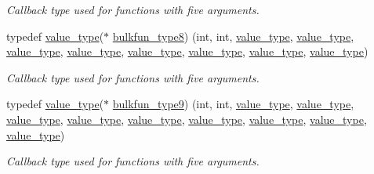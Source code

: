 \begin{DoxyCompactItemize}
\begin{DoxyCompactList}\small\item\em Callback type used for functions with five arguments. \end{DoxyCompactList}\item 
typedef \hyperlink{namespacemu_a17d4f113a4b88b8d971cca8ddbbe8a47}{value\+\_\+type}($\ast$ \hyperlink{namespacemu_aa4e562060c2c2377266ec1cf274856fe}{bulkfun\+\_\+type8}) (int, int, \hyperlink{namespacemu_a17d4f113a4b88b8d971cca8ddbbe8a47}{value\+\_\+type}, \hyperlink{namespacemu_a17d4f113a4b88b8d971cca8ddbbe8a47}{value\+\_\+type}, \hyperlink{namespacemu_a17d4f113a4b88b8d971cca8ddbbe8a47}{value\+\_\+type}, \hyperlink{namespacemu_a17d4f113a4b88b8d971cca8ddbbe8a47}{value\+\_\+type}, \hyperlink{namespacemu_a17d4f113a4b88b8d971cca8ddbbe8a47}{value\+\_\+type}, \hyperlink{namespacemu_a17d4f113a4b88b8d971cca8ddbbe8a47}{value\+\_\+type}, \hyperlink{namespacemu_a17d4f113a4b88b8d971cca8ddbbe8a47}{value\+\_\+type}, \hyperlink{namespacemu_a17d4f113a4b88b8d971cca8ddbbe8a47}{value\+\_\+type})
\begin{DoxyCompactList}\small\item\em Callback type used for functions with five arguments. \end{DoxyCompactList}\item 
typedef \hyperlink{namespacemu_a17d4f113a4b88b8d971cca8ddbbe8a47}{value\+\_\+type}($\ast$ \hyperlink{namespacemu_a51c71d5698d29b40688feaa8e968efc9}{bulkfun\+\_\+type9}) (int, int, \hyperlink{namespacemu_a17d4f113a4b88b8d971cca8ddbbe8a47}{value\+\_\+type}, \hyperlink{namespacemu_a17d4f113a4b88b8d971cca8ddbbe8a47}{value\+\_\+type}, \hyperlink{namespacemu_a17d4f113a4b88b8d971cca8ddbbe8a47}{value\+\_\+type}, \hyperlink{namespacemu_a17d4f113a4b88b8d971cca8ddbbe8a47}{value\+\_\+type}, \hyperlink{namespacemu_a17d4f113a4b88b8d971cca8ddbbe8a47}{value\+\_\+type}, \hyperlink{namespacemu_a17d4f113a4b88b8d971cca8ddbbe8a47}{value\+\_\+type}, \hyperlink{namespacemu_a17d4f113a4b88b8d971cca8ddbbe8a47}{value\+\_\+type}, \hyperlink{namespacemu_a17d4f113a4b88b8d971cca8ddbbe8a47}{value\+\_\+type}, \hyperlink{namespacemu_a17d4f113a4b88b8d971cca8ddbbe8a47}{value\+\_\+type})
\begin{DoxyCompactList}\small\item\em Callback type used for functions with five arguments. \end{DoxyCompactList}\item 

\end{DoxyCompactItemize}
